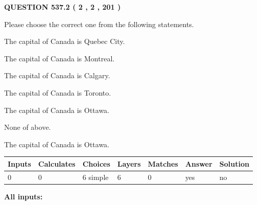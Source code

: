 \documentclass[12pt]{article}
\begin{document}
   
  
\vspace{0.2in}
  
{\textbf{\Large{QUESTION
537.2 
 ( 2 , 2 , 201 )
}}}
  
  
Please choose the correct one from the following statements.
 
 
The capital of Canada is Quebec City.
 
 
The capital of Canada is Montreal.
 
 
The capital of Canada is Calgary.
 
 
The capital of Canada is Toronto.
 
 
The capital of Canada is Ottawa.
 
 
 None of above.
 
 
\noindent{}
 
 
The capital of Canada is Ottawa.
 
 
\noindent{}
 
 
   
   
   
   
\noindent\begin{tabular}{|l|l|l|l|l|l|l|}
 \hline
Inputs & Calculates & Choices & Layers & Matches & Answer & Solution \\ \hline
 0  & 
 0  & 
 6
  simple  
  & 
 6  & 
 0  & 
  yes & 
  no 
  \\ \hline
 \end{tabular}
   
   
   
   
\noindent{}
   
   
   
   
\noindent\vspace{0.1in}\hspace{-0.08in} {\textbf{\Large{All inputs: }}}
   
   
   
   
   
   
 \vspace{0.2in}
 
   
   
\end{document}

